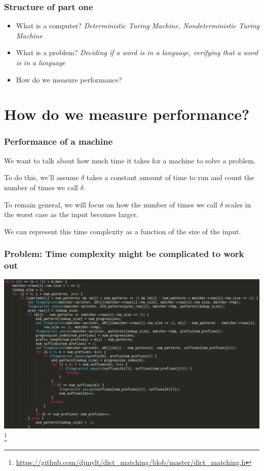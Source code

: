 \documentclass[aspectratio=169]{beamer}
\begin{document}
\begin{frame}
\frametitle{Structure of part one}
\begin{itemize}
    \item What is a computer? {\em Deterministic Turing Machine, Nondeterministic Turing Machine}
    \item What is a problem? {\em Deciding if a word is in a language, verifying that a word is in a language}
    \item How do we measure performance?
\end{itemize}
\end{frame}

\section{How do we measure performance?}

\begin{frame}
\frametitle{Performance of a machine}
We want to talk about how much time it takes for a machine to solve a problem.

To do this, we'll assume $\delta$ takes a constant amount of time to run and count the number of times we call $\delta$.

To remain general, we will focus on how the number of times we call $\delta$ scales in the worst case as the input becomes larger.

We can represent this time complexity as a function of the size of the input.
\end{frame}

\begin{frame}
\frametitle{Problem: Time complexity might be complicated to work out}
\includegraphics[scale=0.25]{complex_code}\footnote{\url{https://github.com/djmylt/dict_matching/blob/master/dict_matching.h}}
\end{frame}
\end{document}

